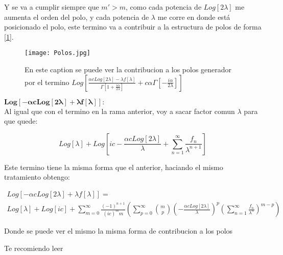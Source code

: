 Y se va a cumplir siempre que $m'> m$, como cada potencia de $Log[2 \lambda]$ me aumenta el orden del polo, y cada potencia de $\lambda$ me corre en donde está posicionado el polo, este termino va a contribuir a la estructura de polos de forma [\ref{fig:Dibujo}]. \\

\begin{figure}
    \centering
    \texttt{[image: Polos.jpg]}
    \caption{En este caption se puede ver la contribucion a los polos generador por el termino $Log[
	\frac{\alpha c Log[2 \lambda] - \lambda f[\lambda] }{\Gamma \left[1 + \frac{i \alpha}{ 2 \lambda} \right] } + 
	c \alpha \Gamma \left[ - \frac{i \alpha}{2 \lambda} \right] ]$ }
    \label{fig:Dibujo}
\end{figure}

$\mathbf{
		Log[- \alpha c Log[2 \lambda] + \lambda f[\lambda] ]
		}: 
		$ \\

Al igual que con el termino en la rama anterior, voy a sacar factor comun $\lambda$ para que quede:

\begin{equation}
Log[\lambda] + 
Log[i c - \frac{\alpha c Log[2 \lambda] }{\lambda} + 
\sum _{n=1} ^{\infty} \frac{f _n}{\lambda ^{n+1}} ]
\end{equation}

Este termino tiene la misma forma que el anterior, haciando el mismo tratamiento obtengo:

\begin{equation}
\begin{array}{c}
Log[- \alpha c Log[2 \lambda] + \lambda f[\lambda] ] = \\
Log[\lambda] + Log[i c] + 
\sum _{m=0} ^{\infty} \frac{(-1)^{n+1}}{(i c) ^m m}
							\left(
								\sum _{p=0} ^{\infty} {m\choose p} 
									\left( - \frac{ \alpha c Log[2 \lambda] } {\lambda} \right) ^p
									\left( \sum _{n=1} ^{\infty} \frac{f _n}{\lambda ^n} \right) ^{m-p} 
								\right)
\end{array}
\end{equation}

Donde se puede ver el mismo la misma forma de contribucion a los polos 



Te recomiendo leer \cite{yo}
